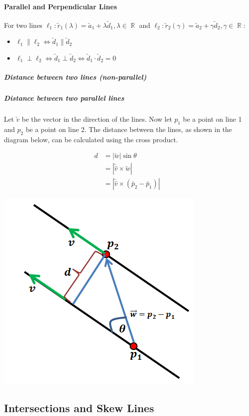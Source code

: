 \documentclass[a4paper,twoside,10pt]{article}
\DeclareMathOperator\R{\mathbb{R}}
\begin{document}
			\paragraph{Parallel and Perpendicular Lines} For two lines $\ell_1:\utilde{r}_1(\lambda)=\utilde{a}_1+\lambda\utilde{d}_1,\lambda\in\R$ and $\ell_2:\utilde{r}_2(\gamma)=\utilde{a}_2+\gamma\utilde{d}_2,\gamma\in\R$:
			\begin{itemize}
				\item $\ell_1\parallel\ell_2 \iff \utilde{d}_1\parallel\utilde{d}_2$
				\item $\ell_1\perp\ell_2 \iff \utilde{d}_1\perp\utilde{d}_2 \iff \utilde{d}_1\cdot\utilde{d}_2=0$
			\end{itemize}
		
			\subparagraph{Distance between two lines (non-parallel)}
			
			\subparagraph{Distance between two parallel lines} Let $\utilde{v}$ be the vector in the direction of the lines. Now let $p_1$ be a point on line 1 and $p_2$ be a point on line 2. The distance between the lines, as shown in the diagram below, can be calculated using the cross product.\\
			\begin{minipage}{0.5\linewidth}
				\begin{align*}
					d&=|\utilde{w}|\sin\theta \\
					&=\left|\utilde{\hat{v}}\times\utilde{w}\right|\\
					&=\left|\utilde{\hat{v}}\times\left(\utilde{p_2}-\utilde{p_1}\right)\right|
				\end{align*}
			\end{minipage}
			\hfill
			\begin{minipage}{0.5\linewidth}
				\includegraphics[width=0.5\linewidth]{vectorlinesdist.png}
			\end{minipage}
		\subsection{Intersections and Skew Lines}
\end{document}
